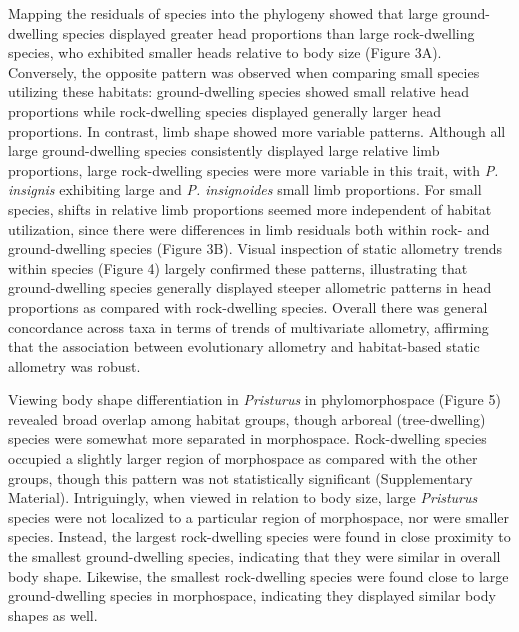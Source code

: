 \documentclass[
  11pt,
]{article}
\begin{document}
Mapping the residuals of species into the phylogeny showed that large
ground-dwelling species displayed greater head proportions than large
rock-dwelling species, who exhibited smaller heads relative to body size
(Figure 3A). Conversely, the opposite pattern was observed when
comparing small species utilizing these habitats: ground-dwelling
species showed small relative head proportions while rock-dwelling
species displayed generally larger head proportions. In contrast, limb
shape showed more variable patterns. Although all large ground-dwelling
species consistently displayed large relative limb proportions, large
rock-dwelling species were more variable in this trait, with \emph{P.
insignis} exhibiting large and \emph{P. insignoides} small limb
proportions. For small species, shifts in relative limb proportions
seemed more independent of habitat utilization, since there were
differences in limb residuals both within rock- and ground-dwelling
species (Figure 3B). Visual inspection of static allometry trends within
species (Figure 4) largely confirmed these patterns, illustrating that
ground-dwelling species generally displayed steeper allometric patterns
in head proportions as compared with rock-dwelling species. Overall
there was general concordance across taxa in terms of trends of
multivariate allometry, affirming that the association between
evolutionary allometry and habitat-based static allometry was robust.
\hfill\break

Viewing body shape differentiation in \emph{Pristurus} in
phylomorphospace (Figure 5) revealed broad overlap among habitat groups,
though arboreal (tree-dwelling) species were somewhat more separated in
morphospace. Rock-dwelling species occupied a slightly larger region of
morphospace as compared with the other groups, though this pattern was
not statistically significant (Supplementary Material). Intriguingly,
when viewed in relation to body size, large \emph{Pristurus} species
were not localized to a particular region of morphospace, nor were
smaller species. Instead, the largest rock-dwelling species were found
in close proximity to the smallest ground-dwelling species, indicating
that they were similar in overall body shape. Likewise, the smallest
rock-dwelling species were found close to large ground-dwelling species
in morphospace, indicating they displayed similar body shapes as well.
\hfill\break
\end{document}
